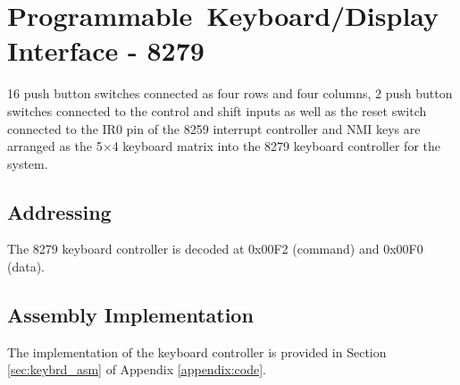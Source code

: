 \section{Programmable Keyboard/Display Interface - 8279}
16 push button switches connected as four rows and four columns, 2 push button switches connected to the control and shift inputs as well as the reset switch connected to the IR0 pin of the 8259 interrupt controller and NMI keys are arranged as the 5$\times$4 keyboard matrix into the 8279 keyboard controller for the system.

    \subsection{Addressing}
    The 8279 keyboard controller is decoded at 0x00F2 (command) and 0x00F0 (data).

    \subsection{Assembly Implementation}
    The implementation of the keyboard controller is provided in Section \ref{sec:keybrd_asm} of Appendix \ref{appendix:code}.
